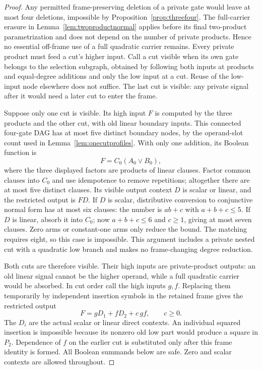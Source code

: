 \documentclass[11pt]{article}
\theoremstyle{definition}
\theoremstyle{remark}
\begin{document}
\begin{proof}
Any permitted frame-preserving deletion of a private gate would leave at most four deletions, impossible by Proposition~\ref{prop:threefour}. The full-carrier erasure in Lemma~\ref{lem:twoproductnormal} applies before its final two-product parametrization and does not depend on the number of private products. Hence no essential off-frame use of a full quadratic carrier remains. Every private product must feed a cut's higher input. Call a cut visible when its own gate belongs to the selection subgraph, obtained by following both inputs at products and equal-degree additions and only the low input at a cut. Reuse of the low-input node elsewhere does not suffice. The last cut is visible: any private signal after it would need a later cut to enter the frame.

Suppose only one cut is visible. Its high input $F$ is computed by the three products and the other cut, with old linear boundary inputs. This connected four-gate DAG has at most five distinct boundary nodes, by the operand-slot count used in Lemma~\ref{lem:onecutprofiles}. With only one addition, its Boolean function is
\[
 F=C_0(A_0\vee B_0),
\]
where the three displayed factors are products of linear clauses. Factor common clauses into $C_0$ and use idempotence to remove repetitions; altogether there are at most five distinct clauses. Its visible output context $D$ is scalar or linear, and the restricted output is $FD$. If $D$ is scalar, distributive conversion to conjunctive normal form has at most six clauses: the number is $ab+c$ with $a+b+c\le5$. If $D$ is linear, absorb it into $C_0$; now $a+b+c\le6$ and $c\ge1$, giving at most seven clauses. Zero arms or constant-one arms only reduce the bound. The matching requires eight, so this case is impossible. This argument includes a private nested cut with a quadratic low branch and makes no frame-changing degree reduction.

Both cuts are therefore visible. Their high inputs are private-product outputs: an old linear signal cannot be the higher operand, while a full quadratic carrier would be absorbed. In cut order call the high inputs $g,f$. Replacing them temporarily by independent insertion symbols in the retained frame gives the restricted output
\[
 F=gD_1+fD_2+c\,gf,\qquad c\ge0.
\]
The $D_i$ are the actual scalar or linear direct contexts. An individual squared insertion is impossible because its nonzero old low part would produce a square in $P_2$. Dependence of $f$ on the earlier cut is substituted only after this frame identity is formed. All Boolean summands below are safe. Zero and scalar contexts are allowed throughout.


\end{proof}
\end{document}
